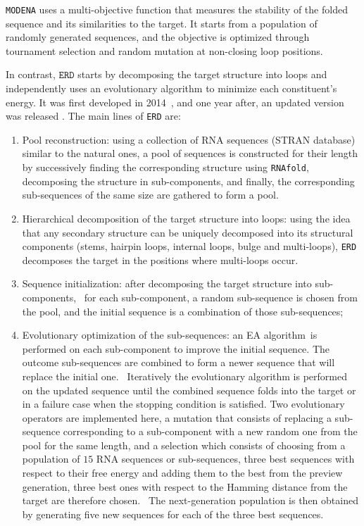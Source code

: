 \texttt{MODENA} uses a multi-objective function that measures the stability of the folded sequence and its similarities to the target. It starts from a population of randomly generated sequences, and the objective is optimized through tournament selection and random mutation at non-closing loop positions. 

In contrast, \(\texttt{ERD}\) starts by decomposing the target structure into loops and independently uses an evolutionary algorithm to minimize each constituent's energy. It was first developed in 2014 \cite{esmaili2014evolutionary}, and one year after, an updated version was released \cite{esmaili2015erd}. The main lines of \texttt{ERD} are:
\begin{enumerate}
	\item Pool reconstruction: using a collection of RNA sequences (STRAN database) similar to the natural ones, a pool of sequences is constructed for their length by successively finding the corresponding structure using \texttt{RNAfold}, decomposing the structure in sub-components, and finally, the corresponding sub-sequences of the same size are gathered to form a pool. 
	\item Hierarchical decomposition of the target structure into loops: using the idea that any secondary structure can be uniquely decomposed into its structural components (stems, hairpin loops, internal loops, bulge and multi-loops), \texttt{ERD} decomposes the target in the positions where multi-loops occur. 
	\item Sequence initialization: after decomposing the target structure into sub-components,  for each sub-component, a random sub-sequence is chosen from the pool, and the initial sequence is a combination of those sub-sequences; 
	\item Evolutionary optimization of the sub-sequences: an EA algorithm is performed on each sub-component to improve the initial sequence. The outcome sub-sequences are combined to form a newer sequence that will replace the initial one.  Iteratively the evolutionary algorithm is performed on the updated sequence until the combined sequence folds into the target or in a failure case when the stopping condition is satisfied. Two evolutionary operators are implemented here, a mutation that consists of replacing a sub-sequence corresponding to a sub-component with a new random one from the pool for the same length, and a selection which consists of choosing from a population of $15$ RNA sequences or sub-sequences, three best sequences with respect to their free energy and adding them to the best from the preview generation, three best ones with respect to the Hamming distance from the target are therefore chosen.  The next-generation population is then obtained by generating five new sequences for each of the three best sequences.
\end{enumerate}

